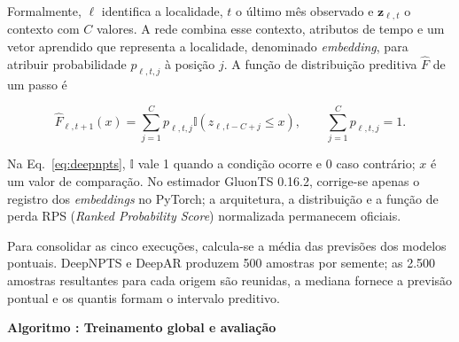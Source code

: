 \documentclass[12pt,a4paper,fleqn]{article}
\newcounter{algoritmo}
\begin{document}
Formalmente, $\ell$ identifica a localidade, $t$ o último mês observado e $\mathbf z_{\ell,t}$ o contexto com $C$ valores. A rede combina esse contexto, atributos de tempo e um vetor aprendido que representa a localidade, denominado \textit{embedding}, para atribuir probabilidade $p_{\ell,t,j}$ à posição $j$. A função de distribuição preditiva $\widehat F$ de um passo é

\begin{equation}
 \widehat F_{\ell,t+1}(x)=\sum_{j=1}^{C}p_{\ell,t,j}
 \mathbb I(z_{\ell,t-C+j}\le x),\qquad \sum_{j=1}^{C}p_{\ell,t,j}=1.
 \label{eq:deepnpts}
\end{equation}

Na Eq.~\eqref{eq:deepnpts}, $\mathbb I$ vale 1 quando a condição ocorre e 0 caso contrário; $x$ é um valor de comparação. No estimador GluonTS 0.16.2, corrige-se apenas o registro dos \textit{embeddings} no PyTorch; a arquitetura, a distribuição e a função de perda RPS (\textit{Ranked Probability Score}) normalizada permanecem oficiais.

Para consolidar as cinco execuções, calcula-se a média das previsões dos modelos pontuais. DeepNPTS e DeepAR produzem 500 amostras por semente; as 2.500 amostras resultantes para cada origem são reunidas, a mediana fornece a previsão pontual e os quantis formam o intervalo preditivo.

\label{alg:sistema}
\noindent\textbf{Algoritmo \thealgoritmo: Treinamento global e avaliação}

\noindent{}
\end{document}
